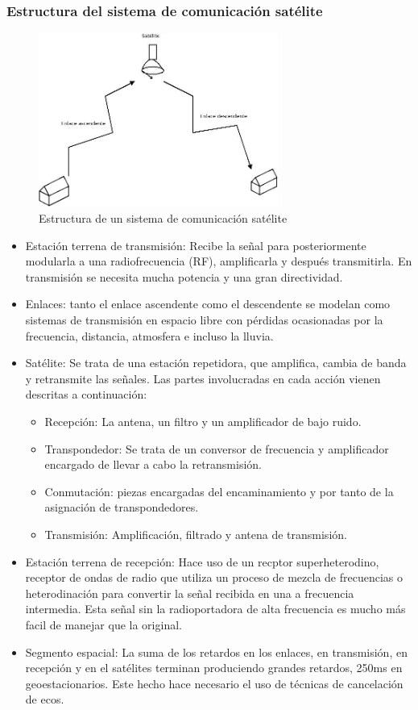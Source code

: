 	\subsubsection{Estructura del sistema de comunicación satélite}
	\label{ssub:estructSat}
		\begin{figure}[htp]
			\centering
			\includegraphics[width=0.7\textwidth]{Imagen/arquisatelite.jpg}
			\caption{Estructura de un sistema de comunicación satélite}
		\end{figure}
		\begin{itemize}
			\item Estación terrena de transmisión: Recibe la señal para posteriormente modularla a una radiofrecuencia (RF), amplificarla y después transmitirla. En transmisión se necesita mucha potencia y una gran directividad.
			\item Enlaces: tanto el enlace ascendente como el descendente se modelan como sistemas de transmisión en espacio libre con pérdidas ocasionadas por la frecuencia, distancia, atmosfera e incluso la lluvia.
			\item Satélite: Se trata de una estación repetidora, que amplifica, cambia de banda y retransmite las señales. Las partes involucradas en cada acción vienen descritas a continuación:
			\begin{itemize}
				\item Recepción: La antena, un filtro y un amplificador de bajo ruido.
				\item Transpondedor: Se trata de un conversor de frecuencia y amplificador encargado de llevar a cabo la retransmisión.
				\item Conmutación: piezas encargadas del encaminamiento y por tanto de la asignación de transpondedores.
				\item Transmisión: Amplificación, filtrado y antena de transmisión.
			\end{itemize}
			\item Estación terrena de recepción: Hace uso de un recptor superheterodino, receptor de ondas de radio que utiliza un proceso de mezcla de frecuencias o heterodinación para convertir la señal recibida en una a frecuencia intermedia. Esta señal sin la radioportadora de alta frecuencia es mucho más facil de manejar que la original.
			\item Segmento espacial: La suma de los retardos en los enlaces, en transmisión, en recepción y en el satélites terminan produciendo grandes retardos, 250ms en geoestacionarios. Este hecho hace necesario el uso de técnicas de cancelación de ecos.
		\end{itemize}
